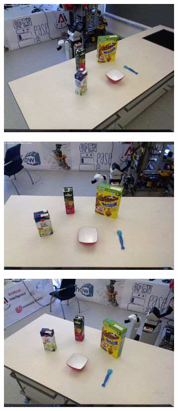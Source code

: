 \begin{figure}
\centering
	\begin{subfigure}[b]{0.3\textwidth}
		\includegraphics[scale=.1]{img/chapter6/real1}
	\end{subfigure}
	\quad
	\begin{subfigure}[b]{0.3\textwidth}
		\includegraphics[scale=.1]{img/chapter6/real2}	
	\end{subfigure}
	\quad
	\begin{subfigure}[b]{0.3\textwidth}
		\includegraphics[scale=.1]{img/chapter6/real3}	

\end{subfigure}
\end{figure}
